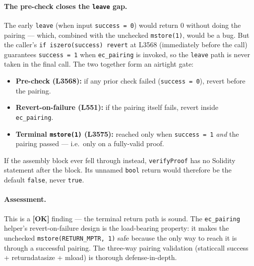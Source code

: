 \paragraph{The pre-check closes the \texttt{leave} gap.} The early
\texttt{leave} (when input \texttt{success = 0}) would return 0
without doing the pairing --- which, combined with the unchecked
\texttt{mstore(1)}, would be a bug. But the caller's
\texttt{if iszero(success) revert} at L3568 (immediately before
the call) guarantees \texttt{success = 1} when
\texttt{ec\_pairing} is invoked, so the \texttt{leave} path is
never taken in the final call. The two together form an airtight
gate:
\begin{itemize}
\item \textbf{Pre-check (L3568):} if any prior check failed
  (\texttt{success = 0}), revert before the pairing.
\item \textbf{Revert-on-failure (L551):} if the pairing itself
  fails, revert inside \texttt{ec\_pairing}.
\item \textbf{Terminal \texttt{mstore(1)} (L3575):} reached only
  when \texttt{success = 1} \emph{and} the pairing passed ---
  i.e.\ only on a fully-valid proof.
\end{itemize}
If the assembly block ever fell through instead, \texttt{verifyProof}
has no Solidity statement after the block. Its unnamed \texttt{bool}
return would therefore be the default \texttt{false}, never
\texttt{true}.

\paragraph{Assessment.} This is a \textcolor{tracegreen}{\textbf{[OK]}}
finding --- the terminal return path is sound. The
\texttt{ec\_pairing} helper's revert-on-failure design is the
load-bearing property: it makes the unchecked
\texttt{mstore(RETURN\_\allowbreak{}MPTR, 1)} safe because the only way to
reach it is through a successful pairing. The three-way pairing
validation (staticcall success + returndatasize + mload) is
thorough defense-in-depth.

